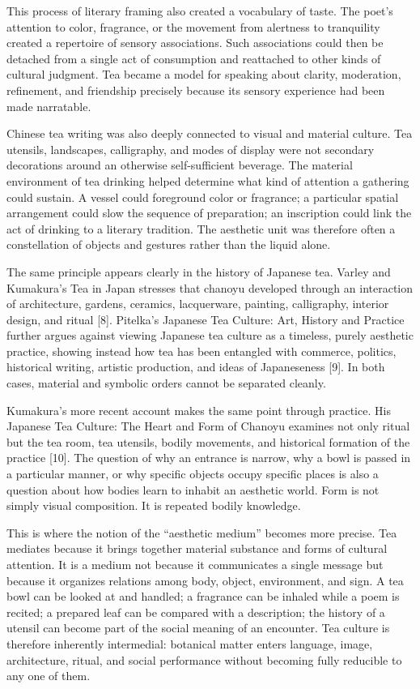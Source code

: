 \documentclass[11pt,a4paper]{article}
\begin{document}
This process of literary framing also created a vocabulary of taste. The poet's attention to color, fragrance, or the movement from alertness to tranquility created a repertoire of sensory associations. Such associations could then be detached from a single act of consumption and reattached to other kinds of cultural judgment. Tea became a model for speaking about clarity, moderation, refinement, and friendship precisely because its sensory experience had been made narratable.

Chinese tea writing was also deeply connected to visual and material culture. Tea utensils, landscapes, calligraphy, and modes of display were not secondary decorations around an otherwise self-sufficient beverage. The material environment of tea drinking helped determine what kind of attention a gathering could sustain. A vessel could foreground color or fragrance; a particular spatial arrangement could slow the sequence of preparation; an inscription could link the act of drinking to a literary tradition. The aesthetic unit was therefore often a constellation of objects and gestures rather than the liquid alone.

The same principle appears clearly in the history of Japanese tea. Varley and Kumakura's Tea in Japan stresses that chanoyu developed through an interaction of architecture, gardens, ceramics, lacquerware, painting, calligraphy, interior design, and ritual [8]. Pitelka's Japanese Tea Culture: Art, History and Practice further argues against viewing Japanese tea culture as a timeless, purely aesthetic practice, showing instead how tea has been entangled with commerce, politics, historical writing, artistic production, and ideas of Japaneseness [9]. In both cases, material and symbolic orders cannot be separated cleanly.

Kumakura's more recent account makes the same point through practice. His Japanese Tea Culture: The Heart and Form of Chanoyu examines not only ritual but the tea room, tea utensils, bodily movements, and historical formation of the practice [10]. The question of why an entrance is narrow, why a bowl is passed in a particular manner, or why specific objects occupy specific places is also a question about how bodies learn to inhabit an aesthetic world. Form is not simply visual composition. It is repeated bodily knowledge.

This is where the notion of the ``aesthetic medium'' becomes more precise. Tea mediates because it brings together material substance and forms of cultural attention. It is a medium not because it communicates a single message but because it organizes relations among body, object, environment, and sign. A tea bowl can be looked at and handled; a fragrance can be inhaled while a poem is recited; a prepared leaf can be compared with a description; the history of a utensil can become part of the social meaning of an encounter. Tea culture is therefore inherently intermedial: botanical matter enters language, image, architecture, ritual, and social performance without becoming fully reducible to any one of them.
\end{document}
